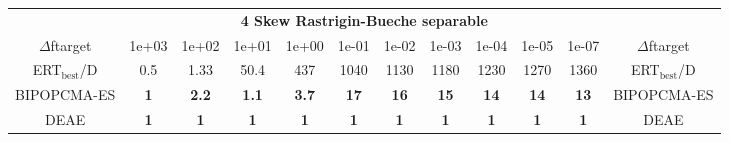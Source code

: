 \begin{tabular}{cccccccccccc}
 & \multicolumn{10}{c}{{\normalsize \textbf{4 Skew Rastrigin-Bueche separable}}}\\
$\Delta$ftarget& 1e+03& 1e+02& 1e+01& 1e+00& 1e-01& 1e-02& 1e-03& 1e-04& 1e-05& 1e-07 & $\Delta$ftarget \\
ERT$_{\textrm{best}}$/D& 0.5& 1.33& 50.4& 437& 1040& 1130& 1180& 1230& 1270& 1360 & ERT$_{\textrm{best}}$/D \\
\hline
BIPOPCMA-ES & \textbf{1} & \textbf{2.2} & \textbf{1.1} & \textbf{3.7} & \textbf{17} & \textbf{16} & \textbf{15} & \textbf{14} & \textbf{14} & \textbf{13} & BIPOPCMA-ES \cite{add_an_entry_for_BIPOPCMA-ES_in_bbob.bib}\\
DEAE & \textbf{1} & \textbf{1} & \textbf{1} & \textbf{1} & \textbf{1} & \textbf{1} & \textbf{1} & \textbf{1} & \textbf{1} & \textbf{1} & DEAE \cite{add_an_entry_for_DEAE_in_bbob.bib}
\end{tabular}
